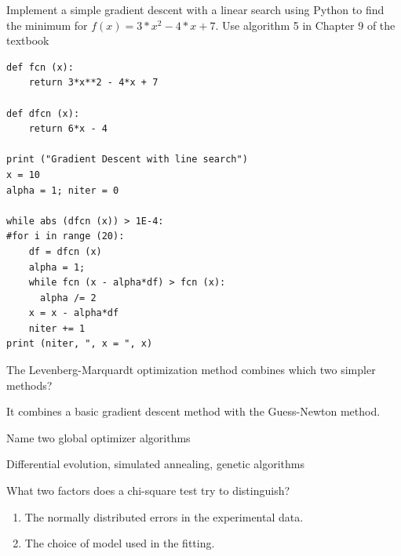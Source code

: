 \documentclass[12pt]{article}
\begin{document}
\begin{question}
Implement a simple gradient descent with a linear search using Python to find the minimum for $f(x) = 3*x^2 - 4*x + 7$. Use algorithm 5 in Chapter 9 of the textbook
\end{question}
\cprotEnv\begin{solution}
\begin{verbatim}
def fcn (x):
    return 3*x**2 - 4*x + 7

def dfcn (x):
    return 6*x - 4

print ("Gradient Descent with line search")
x = 10
alpha = 1; niter = 0

while abs (dfcn (x)) > 1E-4:
#for i in range (20):
    df = dfcn (x)
    alpha = 1;
    while fcn (x - alpha*df) > fcn (x):
      alpha /= 2
    x = x - alpha*df
    niter += 1
print (niter, ", x = ", x)
\end{verbatim}
\end{solution}


\begin{question}
The Levenberg-Marquardt optimization method combines which two simpler methods?
\end{question}
\begin{solution}
It combines a basic gradient descent method with the Guess-Newton method.
\end{solution}


\begin{question}
Name two global optimizer algorithms
\end{question}
\begin{solution}
Differential evolution, simulated annealing, genetic algorithms
\end{solution}


\begin{question}
What two factors does a chi-square test try to distinguish?
\end{question}
\begin{solution}
\begin{enumerate}
\item The normally distributed errors in the experimental data.
\item The choice of model used in the fitting.
\end{enumerate}
\end{solution}
\end{document}
